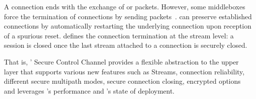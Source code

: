 A \tcp connection ends with the exchange of \fin or \rst packets. However, some
middleboxes force the termination of \tcp connections by sending \rst
packets~\cite{rfc3360,weaver2009detecting}. \tcpls can preserve established
connections by automatically restarting the underlying \tcp connection upon
reception of a spurious reset. \tcpls defines the connection termination at the
stream level: a \tcpls session is closed once the last stream attached to a \tcp
connection is securely closed.

That is, \tcpls' Secure Control Channel provides a flexible abstraction to the
upper layer that supports various new features such as Streams, connection
reliability, different secure multipath modes, secure connection closing,
encrypted \tcp options and leverages \tcp's performance and \tls's state of
deployment.

